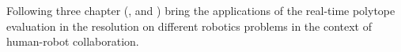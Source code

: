 
Following three chapter (,  and ) bring the applications of the real-time polytope evaluation in the resolution on different robotics problems in the context of human-robot collaboration.



